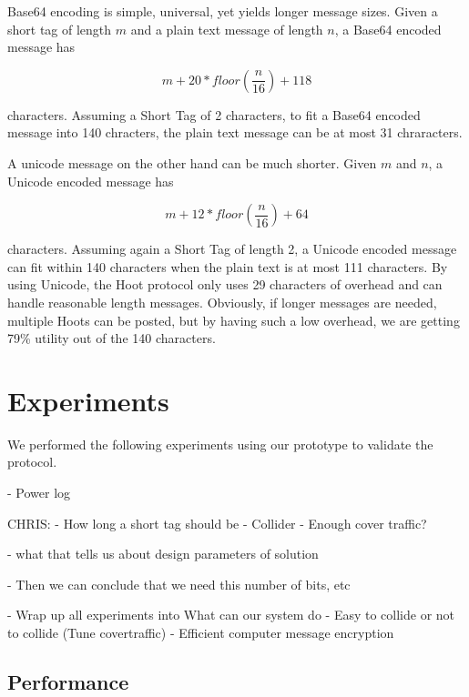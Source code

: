 \documentclass{acm_proc_article-sp}
\begin{document}
Base64 encoding is simple, universal, yet yields longer message sizes. Given a short tag of length $m$ and a plain text message of length $n$, a Base64 encoded message has

\begin{equation}
	m + 20 * floor(\frac{n}{16}) + 118
\end{equation}

characters. Assuming a Short Tag of 2 characters, to fit a Base64 encoded message into 140 chracters, the plain text message can be at most 31 chraracters.

A unicode message on the other hand can be much shorter. Given $m$ and $n$, a Unicode encoded message has

\begin{equation}
	m + 12 * floor(\frac{n}{16}) + 64
\end{equation}

characters. Assuming again a Short Tag of length 2, a Unicode encoded message can fit within 140 characters when the plain text is at most 111 characters. By using Unicode, the Hoot protocol only uses 29 characters of overhead and can handle reasonable length messages. Obviously, if longer messages are needed, multiple Hoots can be posted, but by having such a low overhead, we are getting 79\% utility out of the 140 characters.

\section{Experiments}

We performed the following experiments using our prototype to validate the protocol.


- Power log

CHRIS:
- How long a short tag should be
- Collider
- Enough cover traffic?

- what that tells us about design parameters of solution

- Then we can conclude that we need this number of bits, etc

- Wrap up all experiments into What can our system do
	- Easy to collide or not to collide (Tune covertraffic)
	- Efficient computer message encryption
	




\subsection{Performance}
\end{document}
